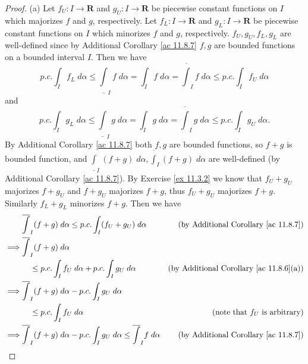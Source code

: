 \begin{proof}{(a)}
    Let \(f_U : I \to \mathbf{R}\) and \(g_U : I \to \mathbf{R}\) be piecewise constant functions on \(I\) which majorizes \(f\) and \(g\), respectively.
    Let \(f_L : I \to \mathbf{R}\) and \(g_L : I \to \mathbf{R}\) be piecewise constant functions on \(I\) which minorizes \(f\) and \(g\), respectively.
    \(f_U, g_U, f_L, g_L\) are well-defined since by Additional Corollary \ref{ac 11.8.7} \(f, g\) are bounded functions on a bounded interval \(I\).
    Then we have
    \[
        p.c. \int_I f_L \; d \alpha \leq \underline{\int}_I f \; d \alpha = \int_I f \; d \alpha = \overline{\int}_I f \; d \alpha \leq p.c. \int_I f_U \; d \alpha
    \]
    and
    \[
        p.c. \int_I g_L \; d \alpha \leq \underline{\int}_I g \; d \alpha = \int_I g \; d \alpha = \overline{\int}_I g \; d \alpha \leq p.c. \int_I g_U \; d \alpha.
    \]
    By Additional Corollary \ref{ac 11.8.7} both \(f, g\) are bounded functions, so \(f + g\) is bounded function, and \(\underline{\int}_I (f + g) \; d \alpha, \overline{\int}_I (f + g) \; d \alpha\) are well-defined (by Additional Corollary \ref{ac 11.8.7}).
    By Exercise \ref{ex 11.3.2} we know that \(f_U + g_U\) majorizes \(f + g_U\) and \(f + g_U\) majorizes \(f + g\), thus \(f_U + g_U\) majorizes \(f + g\).
    Similarly \(f_L + g_L\) minorizes \(f + g\).
    Then we have
    \begin{align*}
                 & \overline{\int}_I (f + g) \; d \alpha \leq p.c. \int_I (f_U + g_U) \; d \alpha                               & \text{(by Additional Corollary \ref{ac 11.8.7})}    \\
        \implies & \overline{\int}_I (f + g) \; d \alpha                                                                                                                              \\
                 & \quad \leq p.c. \int_I f_U \; d \alpha + p.c. \int_I g_U \; d \alpha                                         & \text{(by Additional Corollary \ref{ac 11.8.6}(a))} \\
        \implies & \overline{\int}_I (f + g) \; d \alpha - p.c. \int_I g_U \; d \alpha                                                                                                \\
                 & \quad \leq p.c. \int_I f_U \; d \alpha                                                                       & \text{(note that \(f_U\) is arbitrary)}             \\
        \implies & \overline{\int}_I (f + g) \; d \alpha - p.c. \int_I g_U \; d \alpha \leq \overline{\int}_I f \; d \alpha     & \text{(by Additional Corollary \ref{ac 11.8.7})}    \\

\end{align*}
\end{proof}

